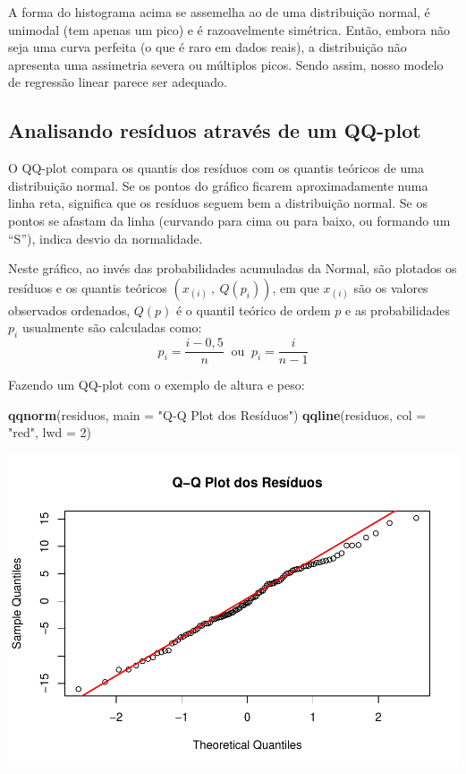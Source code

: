 \documentclass[
]{book}
\newenvironment{Shaded}{\begin{snugshade}}{\end{snugshade}}
\newcommand{\AttributeTok}[1]{\textcolor[rgb]{0.13,0.29,0.53}{#1}}
\newcommand{\DecValTok}[1]{\textcolor[rgb]{0.00,0.00,0.81}{#1}}
\newcommand{\FunctionTok}[1]{\textcolor[rgb]{0.13,0.29,0.53}{\textbf{#1}}}
\newcommand{\NormalTok}[1]{#1}
\newcommand{\StringTok}[1]{\textcolor[rgb]{0.31,0.60,0.02}{#1}}
\begin{document}
A forma do histograma acima se assemelha ao de uma distribuição normal, é unimodal (tem apenas um pico) e é razoavelmente simétrica. Então, embora não seja uma curva perfeita (o que é raro em dados reais), a distribuição não apresenta uma assimetria severa ou múltiplos picos. Sendo assim, nosso modelo de regressão linear parece ser adequado.

\subsection{Analisando resíduos através de um QQ-plot}\label{analisando-resuxedduos-atravuxe9s-de-um-qq-plot}

O QQ-plot compara os quantis dos resíduos com os quantis teóricos de uma distribuição normal. Se os pontos do gráfico ficarem aproximadamente numa linha reta, significa que os resíduos seguem bem a distribuição normal. Se os pontos se afastam da linha (curvando para cima ou para baixo, ou formando um ``S''), indica desvio da normalidade.

Neste gráfico, ao invés das probabilidades acumuladas da Normal, são plotados os resíduos e os quantis teóricos \((x_{(i)} ~,~ Q(p_i))\), em que \(x_{(i)}\) são os valores observados ordenados, \(Q(p)\) é o quantil teórico de ordem \(p\) e as probabilidades \(p_i\) usualmente são calculadas como:
\[
p_i = \frac{i - 0,5}{n} ~ \text{ ou } ~ p_i = \frac{i}{n-1}
\]

Fazendo um QQ-plot com o exemplo de altura e peso:

\begin{Shaded}
\begin{Highlighting}[]
\FunctionTok{qqnorm}\NormalTok{(residuos, }\AttributeTok{main =} \StringTok{"Q{-}Q Plot dos Resíduos"}\NormalTok{)}
\FunctionTok{qqline}\NormalTok{(residuos, }\AttributeTok{col =} \StringTok{"red"}\NormalTok{, }\AttributeTok{lwd =} \DecValTok{2}\NormalTok{)}
\end{Highlighting}
\end{Shaded}

\begin{center}\includegraphics{AED_files/figure-latex/qqplot-1} \end{center}
\end{document}
